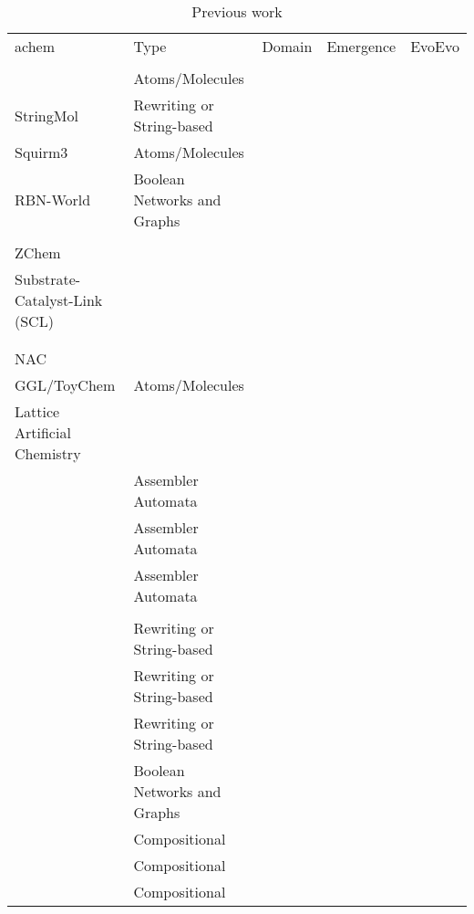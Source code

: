 \begin{table}
	\scriptsize
	\caption{Previous work}
	\label{tab1}
	\begin{tabular}{@{}p{4cm}p{4.5cm}p{4.5cm}@{}}
		\hline\noalign{\smallskip}
		\Gls{achem}                                                        	& Type \autocite{Dittrich:2001zr}	& Domain	& Emergence		& EvoEvo\\ 
		\\ \noalign{\smallskip}
		\hline
		\noalign{\smallskip}
		\cite{Ducharme2012}                                                	&Atoms/Molecules&&&\\
		StringMol \parencite{Hickinbotham2012}                             	&Rewriting or String-based&&&\\
		Squirm3 \parencite{Hutton2002,Hutton2007,Lucht2012}                	&Atoms/Molecules&&&\\
		RBN-World \parencite{Faulconbridge2011}                            	&Boolean Networks and Graphs&&&\\
		\cite{Lenaerts2009}                                                	&&&&\\
		ZChem \parencite{Tominaga2009}                                     	&&&&\\
		Substrate-Catalyst-Link (SCL) \parencite{Varela:1974qd,Suzuki2008} 	&&&&\\
		\cite{Fernando:2008xy,Fernando:2007pf}                             	&&&&\\
		\cite{Gardiner2007}                                                	&&&&\\
		NAC \parencite{Suzuki2006}                                         	&&&&\\						
		GGL/ToyChem \parencite{Benko2003,Benko2005}                        	&Atoms/Molecules&&&\\
		Lattice Artificial Chemistry \parencite{Ono2000,Madina2003}        	&&&&\\
		\autocite{Ofria2004}                                  				&Assembler Automata&&&\\
		\autocite{Ray1991}                                  				&Assembler Automata&&&\\
		\autocite{Lenski2003}												&Assembler Automata&&&\\
		\autocite{Taylor2001}												&&&&\\
		\autocite{Antonakopoulos:2011th}									&Rewriting or String-based&&&\\
		\autocite{Dittrich1998}												&Rewriting or String-based&&&\\
		\autocite{Fenizio2000}\autocite{Fenizio2001}						&Rewriting or String-based&&&\\
		\autocite{Nellis2012}\autocite{Nellis2014}							&Boolean Networks and Graphs&&&\\
		\autocite{Segre1998}												&Compositional&&&\\
		\autocite{Vasas2015, Vasas2012, Vasas2012a}							&Compositional&&&\\
		\autocite{Kauffman1986}												&Compositional&&&\\
		\hline
	\end{tabular}
\end{table}

